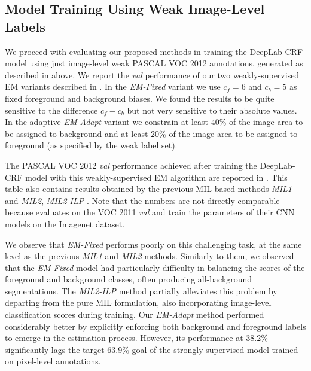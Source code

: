 
\subsection{Model Training Using Weak Image-Level Labels}
\label{sec:test_image}

We proceed with evaluating our proposed methods in training the
DeepLab-CRF model using just image-level weak PASCAL VOC 2012
annotations, generated as described in  above. We
report the \textsl{val} performance of our two weakly-supervised EM
variants described in . In the
\textsl{EM-Fixed} variant we use $c_f = 6$ and $c_b = 5$ as fixed
foreground and background biases. We found the results to be quite
sensitive to the difference $c_f-c_b$ but not very sensitive to their
absolute values. In the adaptive \textsl{EM-Adapt} variant we
constrain at least 40\% of the image area to be assigned to background
and at least 20\% of the image area to be assigned to foreground (as
specified by the weak label set). 

The PASCAL VOC 2012 \textsl{val} performance achieved after training
the DeepLab-CRF model with this weakly-supervised EM algorithm are
reported in . This table also contains results
obtained by the previous MIL-based methods \textsl{MIL1}
\citep{pathak2014fully} and \textsl{MIL2}, \textsl{MIL2-ILP}
\citep{pinheiro2014weakly}. Note that the numbers are not directly
comparable because \citet{pathak2014fully} evaluates on the VOC 2011
\textsl{val} and \citet{pinheiro2014weakly} train the parameters of
their CNN models on the Imagenet dataset. 

We observe that \textsl{EM-Fixed} performs poorly on this challenging
task, at the same level as the previous \textsl{MIL1} and \textsl{MIL2}
methods. Similarly to them, we observed that the \textsl{EM-Fixed}
model had particularly difficulty in balancing the scores of the
foreground and background classes, often producing all-background
segmentations. The \textsl{MIL2-ILP} method partially alleviates this
problem by departing from the pure MIL formulation, also incorporating
image-level classification scores during training. Our
\textsl{EM-Adapt} method performed considerably better by explicitly
enforcing both background and foreground labels to emerge in the
estimation process. However, its performance at 38.2\% significantly
lags the target 63.9\% goal of the strongly-supervised model trained
on pixel-level annotations.

